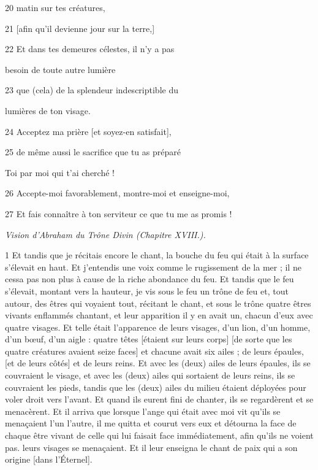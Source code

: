\par 20 matin sur tes créatures,
\par 21 [afin qu'il devienne jour sur la terre,]
\par 22 Et dans tes demeures célestes, il n'y a pas
\par     besoin de toute autre lumière
\par 23 que (cela) de la splendeur indescriptible du
\par     lumières de ton visage.
\par 24 Acceptez ma prière [et soyez-en satisfait],
\par 25 de même aussi le sacrifice que tu as préparé
\par     Toi par moi qui t'ai cherché !
\par 26 Accepte-moi favorablement, montre-moi et enseigne-moi,
\par 27 Et fais connaître à ton serviteur ce que tu me as promis !


\par \textit{Vision d'Abraham du Trône Divin (Chapitre XVIII.).}

\par 1 Et tandis que je récitais encore le chant, la bouche du feu qui était à la surface s'élevait en haut. Et j'entendis une voix comme le rugissement de la mer ; il ne cessa pas non plus à cause de la riche abondance du feu. Et tandis que le feu s'élevait, montant vers la hauteur, je vis sous le feu un trône de feu et, tout autour, des êtres qui voyaient tout, récitant le chant, et sous le trône quatre êtres vivants enflammés chantant, et leur apparition il y en avait un, chacun d'eux avec quatre visages. Et telle était l'apparence de leurs visages, d'un lion, d'un homme, d'un bœuf, d'un aigle : quatre têtes [étaient sur leurs corps] [de sorte que les quatre créatures avaient seize faces] et chacune avait six ailes ; de leurs épaules, [et de leurs côtés] et de leurs reins. Et avec les (deux) ailes de leurs épaules, ils se couvraient le visage, et avec les (deux) ailes qui sortaient de leurs reins, ils se couvraient les pieds, tandis que les (deux) ailes du milieu étaient déployées pour voler droit vers l'avant. Et quand ils eurent fini de chanter, ils se regardèrent et se menacèrent. Et il arriva que lorsque l'ange qui était avec moi vit qu'ils se menaçaient l'un l'autre, il me quitta et courut vers eux et détourna la face de chaque être vivant de celle qui lui faisait face immédiatement, afin qu'ils ne voient pas. leurs visages se menaçaient. Et il leur enseigna le chant de paix qui a son origine [dans l'Éternel].

